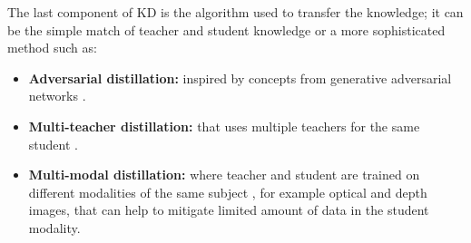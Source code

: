 The last component of KD is the algorithm used to transfer the knowledge; it can be the simple match of teacher and student knowledge or a more sophisticated method such as:
\begin{itemize}
    \item \textbf{Adversarial distillation:} inspired by concepts from generative adversarial networks \cite{belagiannis2018adversarial}.
    \item \textbf{Multi-teacher distillation:} that uses multiple teachers for the same student \cite{hinton2015distilling}.
    \item \textbf{Multi-modal distillation:} where teacher and student are trained on different modalities of the same subject \cite{zhang2023distilling}, for example optical and depth images, that can help to mitigate limited amount of data in the student modality.
\end{itemize}
